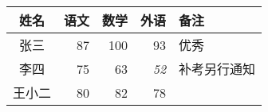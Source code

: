 \begin{tabular}{|c|rrr|p{4em}|}
\hline
  姓名 & 语文 & 数学 & 外语 & 备注 \\
\hline
  张三 & 87 & 100 & 93 & 优秀 \\
  李四 & 75 & 63 & \emph{52} & 补考另行通知 \\
  王小二 & 80 & 82 & 78 & \\
\hline
\end{tabular}
